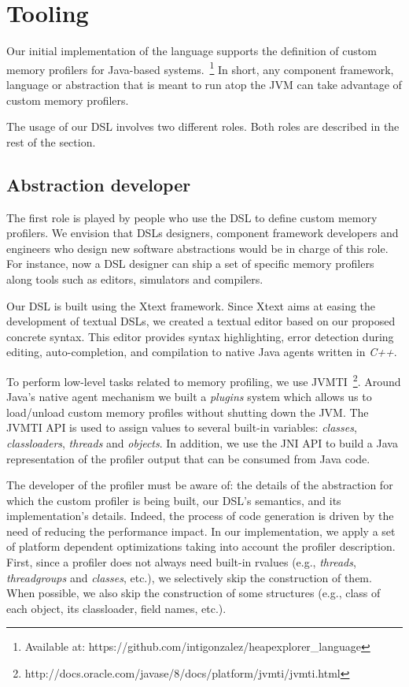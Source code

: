 \section{Tooling}\label{sec:implementation}

Our initial implementation of the language supports the definition of custom memory profilers for Java-based systems.~\footnote{Available at: https://github.com/intigonzalez/heapexplorer\_language}
In short, any component framework, language or abstraction that is meant to run atop the JVM can take advantage of custom memory profilers.

The usage of our DSL involves two different roles.
Both roles are described in the rest of the section.


\subsection{Abstraction developer}

The first role is played by people who use the DSL to define custom memory profilers.
We envision that DSLs designers, component framework developers and engineers who design new software abstractions would be in charge of this role.
For instance, now a DSL designer can ship a set of specific memory profilers along tools such as editors, simulators and compilers. 

Our DSL is built using the Xtext framework.
Since Xtext aims at easing the development of textual DSLs, we created a textual editor based on our proposed concrete syntax.
This editor provides syntax highlighting, error detection during editing, auto-completion, and compilation to native Java agents written in \textit{C++}.

To perform low-level tasks related to memory profiling, we use JVMTI~\footnote{http://docs.oracle.com/javase/8/docs/platform/jvmti/jvmti.html}.
Around Java's native agent mechanism we built a \textit{plugins} system which allows us to load/unload custom memory profiles without shutting down the JVM.
The JVMTI API is used to assign values to several built-in variables: \textit{classes}, \textit{classloaders}, \textit{threads} and \textit{objects}.
In addition, we use the JNI API to build a Java representation of the profiler output that can be consumed from Java code.

The developer of the profiler must be aware of: the details of the abstraction for which the custom profiler is being built, our DSL's semantics, and its implementation's details.
Indeed, the process of code generation is driven by the need of reducing the performance impact.
In our implementation, we apply a set of platform dependent optimizations taking into account the profiler description.
First, since a profiler does not always need built-in rvalues (e.g., \textit{threads}, \textit{threadgroups} and \textit{classes}, etc.), we selectively skip the construction of them.
When possible, we also skip the construction of some structures (e.g., class of each object, its classloader, field names, etc.).

